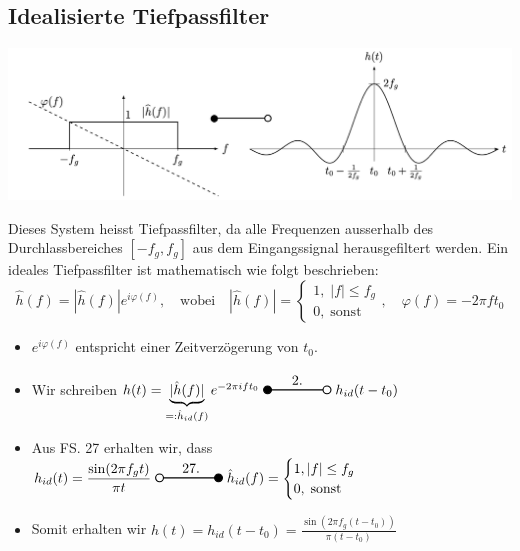 \documentclass[11pt]{article}
\newcommand{\transform}[2]{%
    \begin{tikzpicture}
        \draw[thick] (0,0) circle (0.1);
        \draw[thick] (0.1,0) -- (#2,0) node[midway, above] {#1};
        \filldraw[thick] (#2,0) circle (0.1);
    \end{tikzpicture}%
}
\newcommand{\invtransform}[2]{%
    \begin{tikzpicture}
        \filldraw[thick] (0,0) circle (0.1);
        \draw[thick] (0.1,0) -- (#2 -0.1,0) node[midway, above] {#1};
        \draw[thick] (#2,0) circle (0.1);
    \end{tikzpicture}%
}
\begin{document}
\subsection*{Idealisierte Tiefpassfilter}
\vspace*{-0.5cm}
\begin{center}
    \includegraphics[width=0.8\linewidth]{docimgs/h_id.jpg}
\end{center}
\vspace*{-0.75cm}
Dieses System heisst Tiefpassfilter, da alle Frequenzen ausserhalb des Durchlassbereiches $[-f_g, f_g]$ aus dem Eingangssignal herausgefiltert werden. Ein ideales Tiefpassfilter ist mathematisch wie folgt beschrieben:
$$\hat{h}(f) = |\hat{h}(f)|e^{i \varphi(f)}, \hspace{12pt} \text{wobei} \hspace{12pt} |\hat{h}(f)|= \begin{cases}
    1, \; |f| \leq f_g\\
    0, \; \text{sonst}
\end{cases}, \hspace{12pt} \varphi(f) = -2 \pi f t_0$$
\begin{itemize}[leftmargin=0pt]
    \item[] $e^{i\varphi(f)}$ entspricht einer Zeitverzögerung von $t_0$.
    \item[] Wir schreiben $h(t) = \underbrace{|\hat{h}(f)|}_{=:\hat{h}_{id}(f)} e^{-2\pi i f t_0} \; \invtransform{2.}{1.5} \; h_{id}(t-t_0)$
    \item[] Aus FS. 27 erhalten wir, dass $h_{id}(t) = \displaystyle\frac{\sin(2 \pi f_g t)}{\pi t} \; \transform{27.}{1.5} \; \hat{h}_{id}(f) = \displaystyle\begin{cases}
        1, |f| \leq f_g\\
        0, \; \text{sonst}
    \end{cases}$ 
    \item[] Somit erhalten wir $h(t) = h_{id}(t-t_0) = \displaystyle\frac{\sin(2 \pi f_g (t-t_0))}{\pi (t-t_0)}$
\end{itemize}
\vspace*{-0.5cm}
\end{document}
